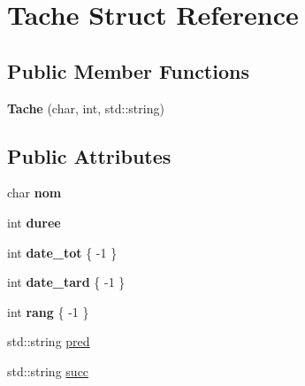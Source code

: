 \hypertarget{structTache}{}\section{Tache Struct Reference}
\label{structTache}
\subsection*{Public Member Functions}
\begin{DoxyCompactItemize}
\item 
{\bfseries Tache} (char, int, std\+::string)\hypertarget{structTache_a0d7909606ccb3e72944568488e9bfc93}{}\label{structTache_a0d7909606ccb3e72944568488e9bfc93}

\end{DoxyCompactItemize}
\subsection*{Public Attributes}
\begin{DoxyCompactItemize}
\item 
char {\bfseries nom}\hypertarget{structTache_a50e786f20e8be4d59b6e7c0afb6a0628}{}\label{structTache_a50e786f20e8be4d59b6e7c0afb6a0628}

\item 
int {\bfseries duree}\hypertarget{structTache_ac339a802000400c002ea00966f0cfb01}{}\label{structTache_ac339a802000400c002ea00966f0cfb01}

\item 
int {\bfseries date\+\_\+tot} \{ -\/1 \}\hypertarget{structTache_a6131887ee5974b3447cf139c2d4b6a13}{}\label{structTache_a6131887ee5974b3447cf139c2d4b6a13}

\item 
int {\bfseries date\+\_\+tard} \{ -\/1 \}\hypertarget{structTache_af800a0738e920eab99e74b62ad075196}{}\label{structTache_af800a0738e920eab99e74b62ad075196}

\item 
int {\bfseries rang} \{ -\/1 \}\hypertarget{structTache_a034265952c1cac1630728005d8b7743b}{}\label{structTache_a034265952c1cac1630728005d8b7743b}

\item 
std\+::string \hyperlink{structTache_a666112b11d4e1580b7fa29ea486fa14e}{pred}
\item 
std\+::string \hyperlink{structTache_a1becca92c78a099c6a2ef99fc0c829cf}{succ}
\end{DoxyCompactItemize}



